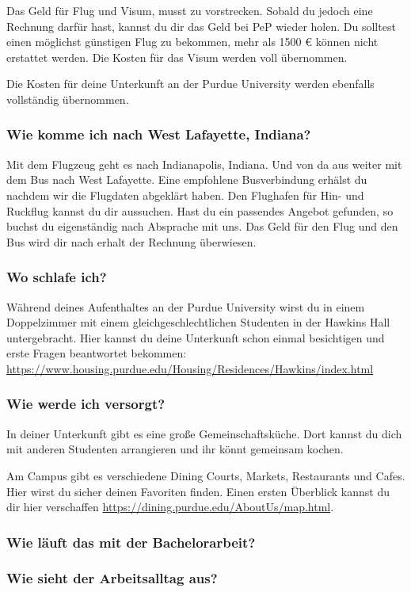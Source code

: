 \documentclass[
  paper=a4,
  fontsize=12pt,
  DIV=16,
  headheight=52pt,
  footheight=45pt,
  headinclude,
  parskip=full,
]{scrartcl}
\begin{document}
Das Geld für Flug und Visum, musst zu vorstrecken.
Sobald du jedoch eine Rechnung darfür hast, kannst du dir das Geld bei PeP
wieder holen.
Du solltest einen möglichst günstigen Flug zu bekommen, mehr als 1500 € können
nicht erstattet werden.
Die Kosten für das Visum werden voll übernommen.

Die Kosten für deine Unterkunft an der Purdue University werden ebenfalls
vollständig übernommen.

\subsubsection*{Wie komme ich nach West Lafayette, Indiana?}
Mit dem Flugzeug geht es nach Indianapolis, Indiana. Und von da aus weiter
mit dem Bus nach West Lafayette.
Eine empfohlene Busverbindung erhälst du nachdem wir die Flugdaten abgeklärt
haben.
Den Flughafen für Hin- und Ruckflug kannst du dir aussuchen.
Hast du ein passendes Angebot gefunden, so buchst du eigenständig nach Absprache
mit uns. Das Geld für den Flug und den Bus wird dir nach erhalt der Rechnung
überwiesen.


\subsubsection*{Wo schlafe ich?}
Während deines Aufenthaltes an der Purdue University wirst du in einem
Doppelzimmer mit einem gleichgeschlechtlichen Studenten in der Hawkins Hall
untergebracht.
Hier kannst du deine Unterkunft schon einmal besichtigen und erste Fragen
beantwortet bekommen:
\url{https://www.housing.purdue.edu/Housing/Residences/Hawkins/index.html}

\subsubsection*{Wie werde ich versorgt?}
In deiner Unterkunft gibt es eine große Gemeinschaftsküche.
Dort kannst du dich mit anderen Studenten arrangieren und ihr könnt gemeinsam
kochen.

Am Campus gibt es verschiedene Dining Courts, Markets, Restaurants und Cafes.
Hier wirst du sicher deinen Favoriten finden.
Einen ersten Überblick kannst du dir hier verschaffen
\url{https://dining.purdue.edu/AboutUs/map.html}.

\subsubsection*{Wie läuft das mit der Bachelorarbeit?}

\subsubsection*{Wie sieht der Arbeitsalltag aus?}
\end{document}
